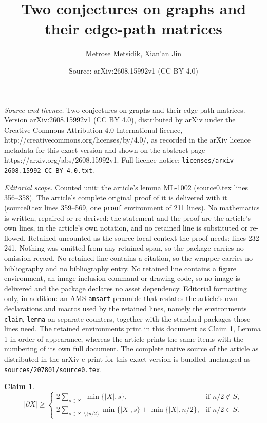 \documentclass[10pt,a4paper]{amsart}
\title{Two conjectures on graphs and their edge-path matrices}
\author{Metrose Metsidik, Xian'an Jin}
\date{Source: arXiv:2608.15992v1 (CC BY 4.0)}
\newtheorem{claim}{Claim}
\begin{document}
\maketitle

\noindent\emph{Source and licence.} Two conjectures on graphs and their edge-path matrices. Version arXiv:2608.15992v1 (CC BY 4.0), distributed by arXiv under the Creative Commons Attribution 4.0 International licence, http://creativecommons.org/licenses/by/4.0/, as recorded in the arXiv licence metadata for this exact version and shown on the abstract page https://arxiv.org/abs/2608.15992v1. Full licence notice: \texttt{licenses/arxiv-2608.15992-CC-BY-4.0.txt}.\par\smallskip

\noindent\textit{Editorial scope.} Counted unit: the article's lemma ML-1002 (source0.tex lines 356--358). The article's complete original proof of it is delivered with it (source0.tex lines 359--569, one \texttt{proof} environment of 211 lines). No mathematics is written, repaired or re-derived: the statement and the proof are the article's own lines, in the article's own notation, and no retained line is substituted or re-flowed.  Retained uncounted as the source-local context the proof needs: lines 232--241.  Nothing was omitted from any retained span, so the package carries no omission record.  No retained line contains a citation, so the wrapper carries no bibliography and no bibliography entry.  No retained line contains a figure environment, an image-inclusion command or drawing code, so no image is delivered and the package declares no asset dependency.  Editorial formatting only, in addition: an AMS \texttt{amsart} preamble that restates the article's own declarations and macros used by the retained lines, namely the environments \texttt{claim}, \texttt{lemma} on separate counters, together with the standard packages those lines need.  The retained environments print in this document as Claim 1, Lemma 1 in order of appearance, whereas the article prints the same items with the numbering of its own full document.  The complete native source of the article as distributed in the arXiv e-print for this exact version is bundled unchanged as \texttt{sources/207801/source0.tex}.
\begin{claim}
\label{cl:stronger}
\[
|\partial X|\geq
\begin{cases}
2\sum\limits_{s\in S^+}\min\{|X|,s\}, & \text{if } n/2\notin S,\\[4pt]
2\sum\limits_{s\in S^+\setminus\{n/2\}}\min\{|X|,s\}+\min\{|X|,n/2\}, & \text{if } n/2\in S.
\end{cases}
\]
\end{claim}
\end{document}

